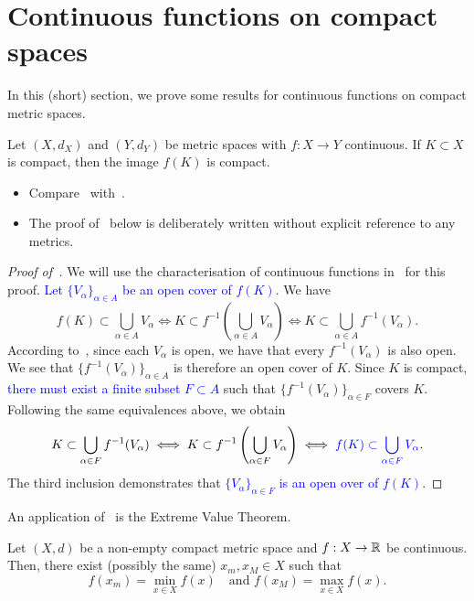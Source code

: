 \section{Continuous functions on compact spaces}
\label{sec:cpct_cts}
In this (short) section, we prove some results for continuous functions on compact metric spaces.
\begin{prop}
	\label{prop:cts_image_cpct}
	Let $(X,d_X)$ and $(Y,d_Y)$ be metric spaces with $f:X\to Y$ continuous. If $K\subset X$ is compact, then the image $f(K)$ is compact.
\end{prop}
\begin{rem}
	\begin{itemize}
		\item Compare~ with~.
		\item The proof of~ below is deliberately written without explicit reference to any metrics.
	\end{itemize}
\end{rem}
\begin{proof}[Proof of~]
	We will use the characterisation of continuous functions in~ for this proof. \textcolor{blue}{Let $\{V_\alpha\}_{\alpha\in A}$ be an open cover of $f(K)$.} We have
	\[
	f(K) \subset \bigcup_{\alpha \in A}V_\alpha \iff K \subset f^{-1}\left(\bigcup_{\alpha \in A}V_\alpha\right) \iff K \subset \bigcup_{\alpha \in A}f^{-1}(V_\alpha).
	\]
	According to~, since each $V_\alpha$ is open, we have that every $f^{-1}(V_\alpha)$ is also open. We see that $\{f^{-1}(V_\alpha)\}_{\alpha \in A}$ is therefore an open cover of $K$. Since $K$ is compact, \textcolor{blue}{there must exist a finite subset $F\subset A$} such that $\{f^{-1}(V_\alpha)\}_{\alpha \in F}$ covers $K$. Following the same equivalences above, we obtain
	\[
	K \subset \bigcup_{\alpha \in F}f^{-1}(V_\alpha) \iff K \subset f^{-1}\left(\bigcup_{\alpha \in F}V_\alpha\right) \iff \textcolor{blue}{f(K) \subset \bigcup_{\alpha \in F}V_\alpha}.
	\]
	The third inclusion demonstrates that \textcolor{blue}{$\{V_\alpha\}_{\alpha \in F}$ is an open over of $f(K)$.}
\end{proof}
An application of~ is the Extreme Value Theorem.
\begin{thm}
	\label{thm:EVT}
	Let $(X,d)$ be a non-empty compact metric space and $f:X\to \mathbb{R}$ be continuous. Then, there exist (possibly the same) $x_m,x_M\in X$ such that
	\[
	f(x_m)= \min_{x\in X}f(x)\quad\text{and }f(x_M)=\max_{x\in X}f(x).
	\]
\end{thm}
